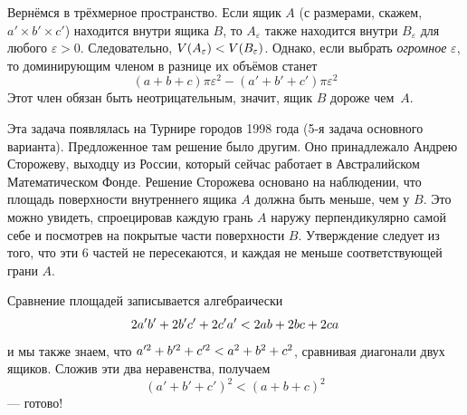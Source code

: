 Вернёмся в трёхмерное пространство.
Если ящик $A$ (с размерами, скажем, $a'\times b'\times c'$) находится внутри ящика $B$, то $A_\varepsilon$ также находится внутри $B_\varepsilon$ для любого $\varepsilon > 0$.
Следовательно, $V(A_\varepsilon ) \z< V(B_\varepsilon)$.
Однако, если выбрать \emph{огромное} $\varepsilon$, то доминирующим членом в разнице их объёмов станет
\[(a+b+c)\pi\varepsilon^2-(a'+b'+c')\pi\varepsilon^2\]
Этот член обязан быть неотрицательным, значит, ящик $B$ дороже чем~$A$.

Эта задача появлялась на Турнире городов 1998 года (5-я задача основного варианта).
Предложенное там решение было другим.
Оно принадлежало Андрею Сторожеву, выходцу из России, который сейчас работает в Австралийском Математическом Фонде.
Решение Сторожева основано на наблюдении, что площадь поверхности внутреннего ящика $A$ должна быть меньше, чем у  $B$.
Это можно увидеть, спроецировав каждую грань $A$ наружу перпендикулярно самой себе и посмотрев на покрытые части поверхности $B$.
Утверждение следует из того, что эти 6 частей не пересекаются, и каждая не меньше соответствующей грани $A$.

Сравнение площадей записывается алгебраически 
\[2a'b'\z+2b'c'\z+2c'a' \z< 2ab\z+2bc\z+2ca\] 
и мы также знаем, что $a'^2\z+b'^2\z+c'^2\z<a^2\z+b^2\z+c^2$, сравнивая диагонали двух ящиков.
Сложив эти два неравенства, получаем 
\[(a'+b'+c')^2<(a+b+c)^2\]
--- готово!

